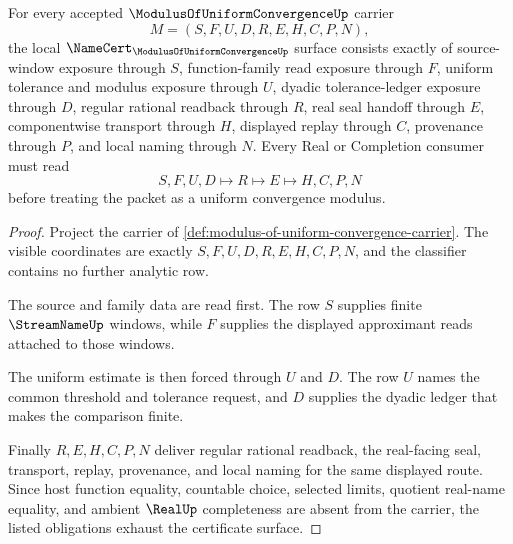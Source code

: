 \begin{theorem}
\label{thm:modulus-of-uniform-convergence-namecert-obligations}
For every accepted $\ModulusOfUniformConvergenceUp$ carrier
$$
M=(S,F,U,D,R,E,H,C,P,N),
$$
the local $\NameCert_{\ModulusOfUniformConvergenceUp}$ surface consists exactly of source-window exposure through $S$, function-family read exposure through $F$, uniform tolerance and modulus exposure through $U$, dyadic tolerance-ledger exposure through $D$, regular rational readback through $R$, real seal handoff through $E$, componentwise transport through $H$, displayed replay through $C$, provenance through $P$, and local naming through $N$. Every Real or Completion consumer must read
$$
S,F,U,D \longmapsto R \longmapsto E \longmapsto H,C,P,N
$$
before treating the packet as a uniform convergence modulus.
\end{theorem}
\begin{proof}
Project the carrier of \autoref{def:modulus-of-uniform-convergence-carrier}. The visible coordinates are exactly $S,F,U,D,R,E,H,C,P,N$, and the classifier contains no further analytic row.

The source and family data are read first. The row $S$ supplies finite $\StreamNameUp$ windows, while $F$ supplies the displayed approximant reads attached to those windows.

The uniform estimate is then forced through $U$ and $D$. The row $U$ names the common threshold and tolerance request, and $D$ supplies the dyadic ledger that makes the comparison finite.

Finally $R,E,H,C,P,N$ deliver regular rational readback, the real-facing seal, transport, replay, provenance, and local naming for the same displayed route. Since host function equality, countable choice, selected limits, quotient real-name equality, and ambient $\RealUp$ completeness are absent from the carrier, the listed obligations exhaust the certificate surface.
\end{proof}

